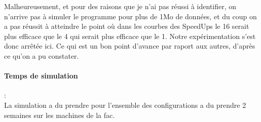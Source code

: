 Malheureusement, et pour des raisons que je n'ai pas réussi à identifier, on n'arrive pas à simuler
le programme pour plus de 1Mo de données, et du coup on a pas réussit à atteindre le point où
dans les courbes des SpeedUps le 16 serait plus efficace que le 4 qui serait plus efficace que le 1.
Notre expérimentation s'est donc arrêtée ici. Ce qui est un bon point d'avance par raport aux autres, d'après ce qu'on a pu constater.

\paragraph{Temps de simulation}:\\
La simulation a du prendre pour l'ensemble des configurations a du prendre 2 semaines sur les
machines de la fac.
